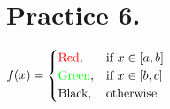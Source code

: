 \documentclass[a4paper,12pt]{article}
\begin{document}
\section*{Practice 6.}
 $f(x)=\begin{cases}
                                \text{\color{red} Red},&\text{if } x\in [a,b]\\
                               \text{\color{green} Green},&\text{if } x\in [b,c]\\
                                \text{\color{black} Black},&\text{otherwise }
                               \end{cases}$
%
%
%
%
%
%
%
%
\end{document}
